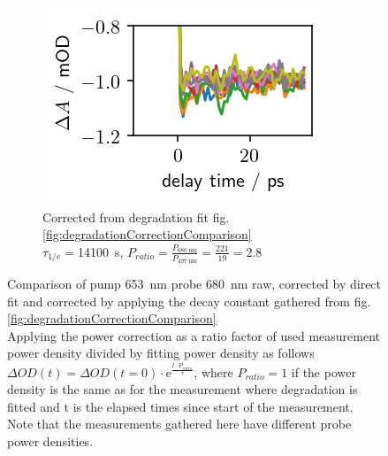 \documentclass[twoside,openright]{scrreprt}
\begin{document}
\begin{figure}[hbtp]
\begin{subfigure}[t]{0.3215\linewidth}
\includegraphics[width=\columnwidth]{images/PowerVarHigh_CorrEstimate14100_2.8.png} 
\caption{Corrected from degradation fit fig. \ref{fig:degradationCorrectionComparison}\\
$\tau_{1/e}=$\SI{14100}{\second}, $P_{ratio}=\frac{P_{\SI{680}{\nano\meter}}}{P_{\SI{497}{\nano\meter}}} = \frac{221}{19}= 2.8$}
\end{subfigure}
\caption{Comparison of pump \SI{653}{\nano\meter} probe \SI{680}{\nano\meter} raw, corrected by direct fit and corrected by applying the decay constant gathered from fig. \ref{fig:degradationCorrectionComparison}\\Applying the power correction as a ratio factor of used measurement power density divided by fitting power density as follows $\Delta OD(t) = \Delta OD(t=0)\cdot \mathrm{e}^{\frac{t\cdot P_{ratio}}{\tau}}$, where $P_{ratio} =1$ if the power density is the same as for the measurement where degradation is fitted and t is the elapsed times since start of the measurement. Note that the measurements gathered here have different probe power densities.\label{fig:powerVarCorrection}}
\end{figure}
\end{document}
